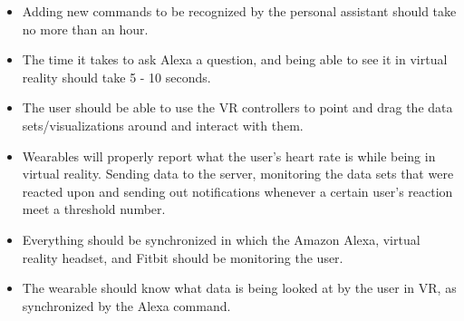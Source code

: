 \documentclass[onecolumn, draftclsnofoot,10pt, compsoc]{IEEEtran}
\begin{document}
\begin{itemize}
\item Adding new commands to be recognized by the personal assistant should take no more than an hour.

\item The time it takes to ask Alexa a question, and being able to see it in virtual reality should take 5 - 10 seconds.

\item The user should be able to use the VR controllers to point and drag the data sets/visualizations around and interact with them.

\item Wearables will properly report what the user’s heart rate is while being in virtual reality. Sending data to the server, monitoring the data sets that were reacted upon and sending out notifications whenever a certain user’s reaction meet a threshold number.

\item Everything should be synchronized in which the Amazon Alexa, virtual reality headset, and Fitbit should be monitoring the user. 

\item The wearable should know what data is being looked at by the user in VR, as synchronized by the Alexa command.
\end{itemize}
\end{document}
